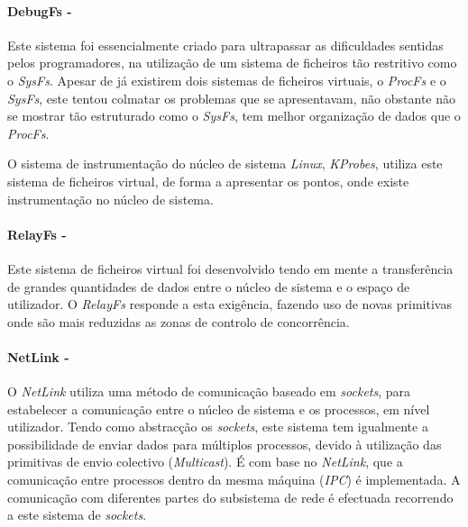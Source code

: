 \paragraph*{DebugFs - }\label{cap:DebugFs_overview}

Este sistema foi essencialmente criado para ultrapassar as dificuldades sentidas pelos programadores, na utilização de um sistema de ficheiros tão restritivo como o \textit{SysFs}.
Apesar de já existirem dois sistemas de ficheiros virtuais, o \textit{ProcFs} e o \textit{SysFs}, este tentou colmatar os problemas que se apresentavam, não obstante não se mostrar tão estruturado como o \textit{SysFs}, tem melhor organização de dados que o \textit{ProcFs}.

O sistema de instrumentação do núcleo de sistema \textit{Linux}, \textit{KProbes}, utiliza este sistema de ficheiros virtual, de forma a apresentar os pontos, onde existe instrumentação no núcleo de sistema.

\paragraph*{RelayFs - }\label{cap:RelayFs_overview}

Este sistema de ficheiros virtual foi desenvolvido tendo em mente a transferência de grandes quantidades de dados entre o núcleo de sistema e o espaço de utilizador.
O \textit{RelayFs} responde a esta exigência, fazendo uso de novas primitivas onde são mais reduzidas as zonas de controlo de concorrência\cite{Donovan2007}.

\paragraph*{NetLink - }\label{cap:NetLink_overview}
O \textit{NetLink} utiliza uma método de comunicação baseado em \textit{sockets}, para estabelecer a comunicação entre o núcleo de sistema e os processos, em nível utilizador. 
 Tendo como abstracção os \textit{sockets}, este sistema tem igualmente a possibilidade de enviar dados para múltiplos processos, devido à utilização das primitivas de envio colectivo (\textit{Multicast}).
 É com base no \textit{NetLink}, que a comunicação entre processos dentro da mesma máquina (\textit{IPC}) é implementada.
 A comunicação com diferentes partes do subsistema de rede é efectuada recorrendo a este sistema de \textit{sockets}.

